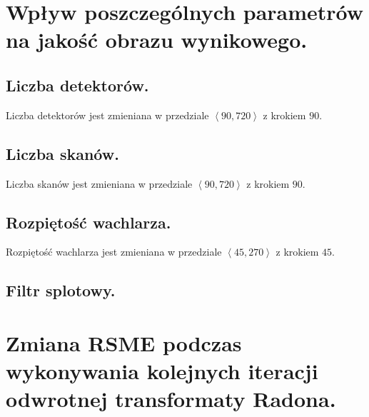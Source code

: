 \documentclass[a4paper, 11pt]{article}
\begin{document}
\section{Wpływ poszczególnych parametrów na jakość obrazu wynikowego.}
\subsection{Liczba detektorów.}

Liczba detektorów jest zmieniana w przedziale $\left<90, 720 \right>$ z krokiem $90$.
\subsection{Liczba skanów.}

Liczba skanów jest zmieniana w przedziale $\left<90, 720 \right>$ z krokiem $90$.
\subsection{Rozpiętość wachlarza.}

Rozpiętość wachlarza jest zmieniana w przedziale $\left<45, 270 \right>$ z krokiem $45$.
\subsection{Filtr splotowy.}

\section{Zmiana RSME podczas wykonywania kolejnych iteracji odwrotnej transformaty Radona.}
\end{document}
